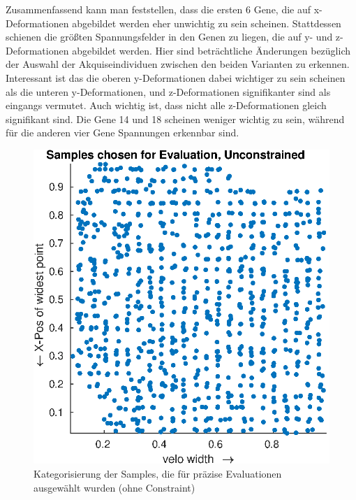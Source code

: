 Zusammenfassend kann man feststellen, dass die ersten 6 Gene, die auf x-Deformationen abgebildet werden eher unwichtig zu sein scheinen.
Stattdessen schienen die größten Spannungsfelder in den Genen zu liegen, die auf y- und z-Deformationen abgebildet werden.
Hier sind beträchtliche Änderungen bezüglich der Auswahl der Akquiseindividuen zwischen den beiden Varianten zu erkennen.
Interessant ist das die oberen y-Deformationen dabei wichtiger zu sein scheinen als die unteren y-Deformationen, und z-Deformationen signifikanter sind als eingangs vermutet.
Auch wichtig ist, dass nicht alle z-Deformationen gleich signifikant sind.
Die Gene 14 und 18 scheinen weniger wichtig zu sein, während für die anderen vier Gene Spannungen erkennbar sind.

\begin{figure}[h]
	\centering
	\begin{minipage}{0.45\textwidth}
		\centering
		\includegraphics[width=1\linewidth]{bilder/6pt1000Samples/acqSamplesUncon}
		\caption{Kategorisierung der Samples, die für präzise Evaluationen ausgewählt wurden (ohne Constraint)}
		\label{fig:acqSamplesUncon}
	\end{minipage}\hfill
	\begin{minipage}{0.45\textwidth}
		\centering

\end{minipage}
\end{figure}
